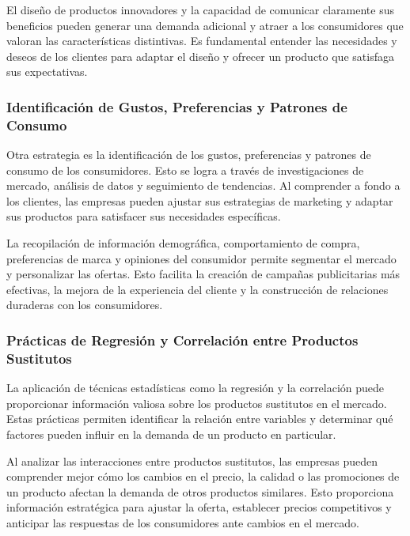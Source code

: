 \documentclass[
  a4paper,
]{article}
\begin{document}
El diseño de productos innovadores y la capacidad de comunicar
claramente sus beneficios pueden generar una demanda adicional y atraer
a los consumidores que valoran las características distintivas. Es
fundamental entender las necesidades y deseos de los clientes para
adaptar el diseño y ofrecer un producto que satisfaga sus expectativas.

\hypertarget{identificaciuxf3n-de-gustos-preferencias-y-patrones-de-consumo}{%
\subsubsection{Identificación de Gustos, Preferencias y Patrones de
Consumo}\label{identificaciuxf3n-de-gustos-preferencias-y-patrones-de-consumo}}

Otra estrategia es la identificación de los gustos, preferencias y
patrones de consumo de los consumidores. Esto se logra a través de
investigaciones de mercado, análisis de datos y seguimiento de
tendencias. Al comprender a fondo a los clientes, las empresas pueden
ajustar sus estrategias de marketing y adaptar sus productos para
satisfacer sus necesidades específicas.

La recopilación de información demográfica, comportamiento de compra,
preferencias de marca y opiniones del consumidor permite segmentar el
mercado y personalizar las ofertas. Esto facilita la creación de
campañas publicitarias más efectivas, la mejora de la experiencia del
cliente y la construcción de relaciones duraderas con los consumidores.

\hypertarget{pruxe1cticas-de-regresiuxf3n-y-correlaciuxf3n-entre-productos-sustitutos}{%
\subsubsection{Prácticas de Regresión y Correlación entre Productos
Sustitutos}\label{pruxe1cticas-de-regresiuxf3n-y-correlaciuxf3n-entre-productos-sustitutos}}

La aplicación de técnicas estadísticas como la regresión y la
correlación puede proporcionar información valiosa sobre los productos
sustitutos en el mercado. Estas prácticas permiten identificar la
relación entre variables y determinar qué factores pueden influir en la
demanda de un producto en particular.

Al analizar las interacciones entre productos sustitutos, las empresas
pueden comprender mejor cómo los cambios en el precio, la calidad o las
promociones de un producto afectan la demanda de otros productos
similares. Esto proporciona información estratégica para ajustar la
oferta, establecer precios competitivos y anticipar las respuestas de
los consumidores ante cambios en el mercado.
\end{document}
